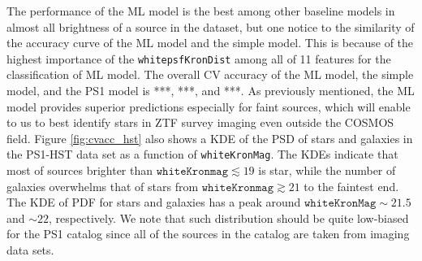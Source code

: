 \documentclass[twocolumn]{aastex62}
\begin{document}
{The performance of the ML model is the best among other baseline models in almost all brightness of a source in the dataset, 
but one notice to the similarity of the accuracy curve of the ML model and the simple model. 
This is because of the highest importance of the \texttt{whitepsfKronDist} 
among all of 11 features for the classification of ML model. 
The overall CV accuracy of the ML model, the simple model, and the PS1 model is 
***, ***, and ***. 
As previously mentioned, the ML model provides superior predictions 
especially for faint sources, which will enable to us to best identify stars in ZTF survey imaging 
even outside the COSMOS field. 
Figure \ref{fig:cvacc_hst} also shows a KDE of the PSD of stars and galaxies in the PS1-HST data set 
as a function of \texttt{whiteKronMag}. 
The KDEs indicate that most of sources brighter than $\mathtt{whiteKronmag} \lesssim 19$ is star, 
while the number of galaxies overwhelms that of stars from $\mathtt{whiteKronmag} \gtrsim 21$ to the faintest end. 
The KDE of PDF for stars and galaxies has a peak around $\mathtt{whiteKronMag} \sim 21.5$ and $\sim 22$, 
respectively. 
We note that such distribution should be quite low-biased for the PS1 catalog 
since all of the sources in the catalog are taken from imaging data sets. 

}
\end{document}
